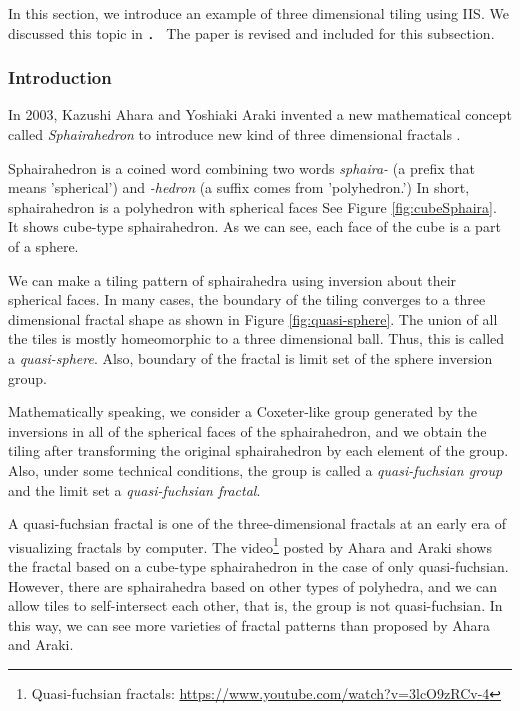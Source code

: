 In this section, we introduce an example of three dimensional
tiling using IIS. 
We discussed this topic in \cite{bridges2018NakamuraAhara}． %
The paper is revised and included for this subsection.

\subsubsection{Introduction}

In 2003, Kazushi Ahara and Yoshiaki Araki invented a new mathematical
concept called \textit{Sphairahedron} to introduce new kind of three
dimensional fractals \cite{ahara2003sphairahedral}.

Sphairahedron is a coined word combining two words \textit{sphaira-}
(a prefix that means 'spherical') and \textit{-hedron} (a suffix comes
from 'polyhedron.')
In short, sphairahedron is a polyhedron with spherical faces
See Figure \ref{fig:cubeSphaira}.
It shows cube-type sphairahedron. 
As we can see, each face of the cube is a part of a sphere.

We can make a tiling pattern of sphairahedra using inversion about their
spherical faces.
In many cases, the boundary of the tiling converges to a three dimensional fractal
shape as shown in Figure \ref{fig:quasi-sphere}.
The union of all the tiles is mostly homeomorphic to a three dimensional
ball. Thus, this is called a \textit{quasi-sphere}.
Also, boundary of the fractal is limit set of the sphere inversion group.

Mathematically speaking, we consider a Coxeter-like group generated by the
inversions in all of the spherical faces of the sphairahedron, and
we obtain the tiling after transforming the original sphairahedron by
each element of the group.
Also, under some technical conditions, the group is called a
\textit{quasi-fuchsian group} and the limit set a \textit{quasi-fuchsian
fractal}.

A quasi-fuchsian fractal is one of the three-dimensional
fractals at an early era of visualizing fractals by computer.
The video\footnote{Quasi-fuchsian fractals:
\url{https://www.youtube.com/watch?v=3lcO9zRCv-4}}
posted by Ahara and Araki shows the fractal based on a cube-type
sphairahedron in the case of only quasi-fuchsian.
However, there are sphairahedra based on other types of polyhedra, and
we can allow tiles to self-intersect each other, that is, the group is
not quasi-fuchsian.
In this way, we can see more varieties of fractal patterns
than proposed by Ahara and Araki.
         
